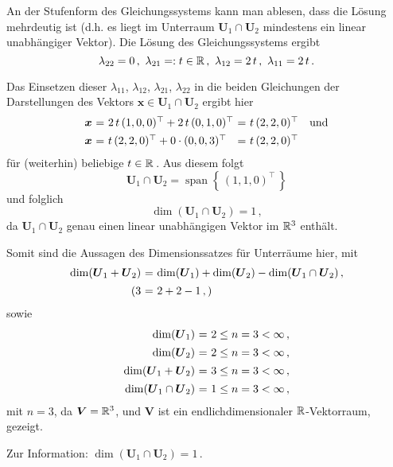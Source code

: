 {\medskip
An der Stufenform des Gleichungssystems kann man ablesen, dass die Lösung
mehrdeutig ist (d.h. es liegt im Unterraum $\boldsymbol U_1 \cap \boldsymbol U_2$
mindestens ein linear unabhängiger Vektor).
% 
Die Lösung des Gleichungssystems ergibt
$$
\lambda_{22} = 0\,,\,\,
\lambda_{21} =: t \in \mathbb{R}\,,\,\,
\lambda_{12} = 2\, t\,,\,\,
\lambda_{11} = 2\, t\,.
$$

Das Einsetzen dieser $\lambda_{11}$, $\lambda_{12}$, $\lambda_{21}$,
$\lambda_{22}$ in die beiden Gleichungen der Darstellungen des Vektors
$\boldsymbol x \in \boldsymbol U_1 \cap \boldsymbol U_2$
ergibt hier
$$
\begin{array}{r@{\,\,}c@{\,\,}l@{\,\,}c@{\,\,}l}
\boldsymbol x
&=& 2\, t\, (1, 0, 0)^\top + 2\, t\, (0, 1, 0)^\top
&=& t\, (2, 2, 0)^\top
\quad \text{und}\\[1ex]
% 
\boldsymbol x
&=& t\, (2, 2, 0)^\top + 0 \cdot (0, 0, 3)^\top
&=& t\, (2, 2, 0)^\top
\end{array}
$$
für (weiterhin) beliebige $t \in \mathbb{R}$\,.
% 
Aus diesem folgt
$$
\boldsymbol U_1 \cap \boldsymbol U_2 =
\operatorname{span}\left\{\, (1, 1, 0)^\top \,\right\}
$$
und folglich
$$
\dim(\boldsymbol U_1 \cap \boldsymbol U_2) = 1\,,
$$
da $\boldsymbol U_1 \cap \boldsymbol U_2$
genau einen linear unabhängigen Vektor im $\mathbb{R}^3$ enthält.

\bigskip
Somit sind die Aussagen des Dimensionssatzes für Unterräume hier, mit
$$
\begin{array}{r@{\,\,}c@{\,\,}l}
\dim(\boldsymbol U_1 + \boldsymbol U_2)
&=& \dim(\boldsymbol U_1) + \dim(\boldsymbol U_2)
 - \dim(\boldsymbol U_1 \cap \boldsymbol U_2)\,,\\[1ex]
% 
(3 &=& 2 + 2 - 1\,,)
\end{array}
$$
% 
sowie
$$
\begin{array}{r@{\,\,}c@{\,\,}l}
\dim(\boldsymbol U_1) &=& 2 \le n = 3 < \infty\,,\\[1ex]
\dim(\boldsymbol U_2) &=& 2 \le n = 3 < \infty\,,\\[1ex]
\dim(\boldsymbol U_1 + \boldsymbol U_2) &=& 3 \le n = 3 < \infty\,,\\[1ex]
\dim(\boldsymbol U_1 \cap \boldsymbol U_2) &=& 1 \le n = 3 < \infty\,,
\end{array}
$$
mit $n=3$, da $\boldsymbol V = \mathbb{R}^3$,
und $\boldsymbol V$ ist ein endlichdimensionaler $\mathbb{R}$-Vektorraum,
gezeigt.
}

{
Zur Information: $\dim( \boldsymbol U_1 \cap \boldsymbol U_2 ) = 1$\,.
}
